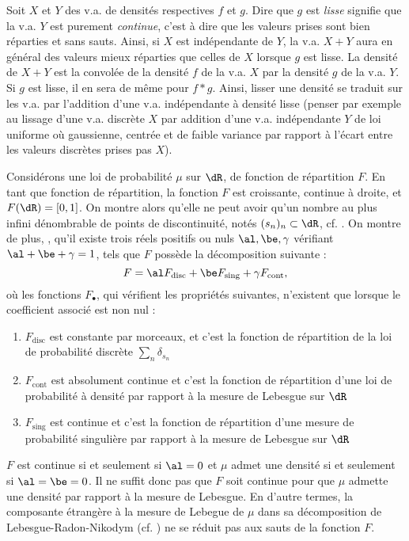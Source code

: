 \begin{eur}[Convolution des densités = addition d'un bruit indépendant sur la v.a.]
  Soit $X$ et $Y$ des v.a. de densités respectives $f$ et $g$.  Dire que $g$
  est \emph{lisse} signifie que la v.a. $Y$ est purement \emph{continue},
  c'est à dire que les valeurs prises sont bien réparties et sans sauts.
  Ainsi, si $X$ est indépendante de $Y$, la v.a. $X+Y$ aura en général des
  valeurs mieux réparties que celles de $X$ lorsque $g$ est lisse.  La densité
  de $X+Y$ est la convolée de la densité $f$ de la v.a. $X$ par la densité $g$
  de la v.a. $Y$.  Si $g$ est lisse, il en sera de même pour $f*g$.  Ainsi,
  lisser une densité se traduit sur les v.a. par l'addition d'une v.a.
  indépendante à densité lisse (penser par exemple au lissage d'une v.a.
  discrète $X$ par addition d'une v.a. indépendante $Y$ de loi uniforme où
  gaussienne, centrée et de faible variance par rapport à l'écart entre les
  valeurs discrètes prises pas $X$).
\end{eur}

\begin{rem}
  Considérons une loi de probabilité $\mu$ sur $\dR$, de fonction de
  répartition $F$. En tant que fonction de répartition, la fonction $F$ est
  croissante, continue à droite, et $F(\dR)=[0,1]$. On montre alors qu'elle ne
  peut avoir qu'un nombre au plus infini dénombrable de points de discontinuité, notés
  $(s_n)_n\subset\dR$, cf.  \cite[prop. III.2.2 page
  48]{barbe-ledoux}. On montre de plus, \cite[III, pages 49-50]{barbe-ledoux},
  qu'il existe trois réels positifs ou nuls $\al, \be, \gamma$ vérifiant
  $\al+\be+\gamma=1$, tels que $F$ possède la décomposition suivante :
  $$
  F=\al F_{\text{disc}} + \be F_{\text{sing}} + \gamma F_{\text{cont}},
  $$
  où les fonctions $F_\bullet$, qui vérifient les propriétés suivantes,
  n'existent que lorsque le coefficient associé est non nul :
  \begin{enumerate}
  \item $F_{\text{disc}}$ est constante par morceaux, et c'est la fonction de
    répartition de la loi de probabilité discrète
    $\sum_n\delta_{s_n}$
  \item $F_{\text{cont}}$ est absolument continue et c'est la fonction de
    répartition d'une loi de probabilité à densité par rapport à la mesure de
    Lebesgue sur $\dR$
  \item $F_{\text{sing}}$ est continue et c'est la fonction de répartition
    d'une mesure de probabilité singulière par rapport à la mesure de Lebesgue
    sur $\dR$
  \end{enumerate}
  $F$ est continue si et seulement si $\al=0$ et $\mu$ admet une densité si et
  seulement si $\al=\be=0$.  Il ne suffit donc pas que $F$ soit continue pour
  que $\mu$ admette une densité par rapport à la mesure de Lebesgue. En
  d'autre termes, la composante étrangère à la mesure de Lebegue de $\mu$ dans
  sa décomposition de Lebesgue-Radon-Nikodym (cf. \cite[thm 6.9, page
  117]{rudin}) ne se réduit pas aux sauts de la fonction $F$. 
  
\end{rem}


